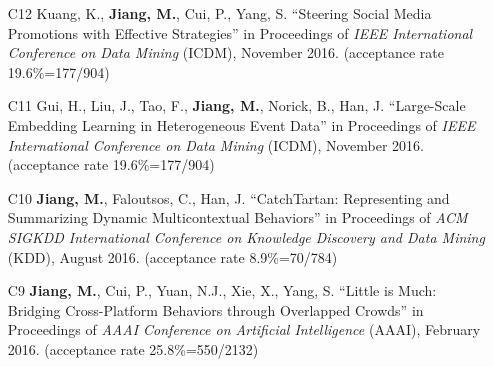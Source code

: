 \documentclass[10pt]{article}
\newenvironment{myindentpar}[1]%
{\begin{list}{}%
         {\setlength{\leftmargin}{#1}}%
         \item[]%
}
{\end{list}}
\newcounter{list}
\newcommand{\hide}[1]{}
\begin{document}
\begin{myindentpar}{0.00cm}
\begin{enumerate}[leftmargin=.5cm]
	\hide{\vspace{-0.1cm}\hspace{0.5cm}{\small \emph{Mr. Kuang conceived the idea in consultation with myself. Mr. Kuang implemented the system and completed the experiments. Mr. Kuang wrote the paper.}}}

\item[C12] Kuang, K., \textbf{Jiang, M.}, Cui, P., Yang, S. ``Steering Social Media Promotions with Effective Strategies'' in Proceedings of \emph{IEEE International Conference on Data Mining} (ICDM), November 2016. (acceptance rate 19.6\%=177/904)

	\hide{\vspace{-0.1cm}\hspace{0.5cm}{\small \emph{I conceived the idea. Mr. Kuang implemented the system and completed the experiments. Mr. Kuang and I wrote the paper.}}}

\item[C11] Gui, H., Liu, J., Tao, F., \textbf{Jiang, M.}, Norick, B., Han, J. ``Large-Scale Embedding Learning in Heterogeneous Event Data'' in Proceedings of \emph{IEEE International Conference on Data Mining} (ICDM), November 2016. (acceptance rate 19.6\%=177/904)

	\hide{\vspace{-0.1cm}\hspace{0.5cm}{\small \emph{Ms. Gui conceived the idea in consultation with myself. Ms. Gui, her colleague Dr. Liu, and I implemented the system and completed the experiments. Ms. Gui wrote the paper. I edited the paper.}}}

\item[C10] \textbf{Jiang, M.}, Faloutsos, C., Han, J. ``CatchTartan: Representing and Summarizing Dynamic Multicontextual Behaviors'' in Proceedings of \emph{ACM SIGKDD International Conference on Knowledge Discovery and Data Mining} (KDD), August 2016. (acceptance rate 8.9\%=70/784)

	\hide{\vspace{-0.1cm}\hspace{0.5cm}{\small \emph{I conceived the idea, designed the study, did the experiments, and wrote the paper.}}}

\item[C9] \textbf{Jiang, M.}, Cui, P., Yuan, N.J., Xie, X., Yang, S. ``Little is Much: Bridging Cross-Platform Behaviors through Overlapped Crowds'' in Proceedings of \emph{AAAI Conference on Artificial Intelligence} (AAAI), February 2016. (acceptance rate 25.8\%=550/2132)


\end{enumerate}
\end{myindentpar}
\end{document}
